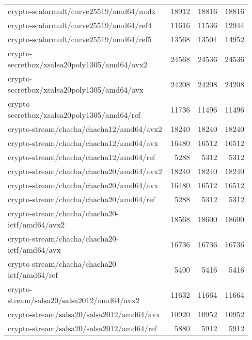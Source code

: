 \begin{table}
\begin{tabular}{lrrr}
crypto-scalarmult/curve25519/amd64/mulx &
18912 &
18816 &
18816\\ 


crypto-scalarmult/curve25519/amd64/ref4 &
11616 &
11536 &
12944\\ 


crypto-scalarmult/curve25519/amd64/ref5 &
13568 &
13504 &
14952\\ 


crypto-secretbox/xsalsa20poly1305/amd64/avx2 &
24568 &
24536 &
24536\\ 


crypto-secretbox/xsalsa20poly1305/amd64/avx &
24208 &
24208 &
24208\\ 


crypto-secretbox/xsalsa20poly1305/amd64/ref &
11736 &
11496 &
11496\\ 


crypto-stream/chacha/chacha12/amd64/avx2 &
18240 &
18240 &
18240\\ 


crypto-stream/chacha/chacha12/amd64/avx &
16480 &
16512 &
16512\\ 


crypto-stream/chacha/chacha12/amd64/ref &
5288 &
5312 &
5312\\ 


crypto-stream/chacha/chacha20/amd64/avx2 &
18240 &
18240 &
18240\\ 


crypto-stream/chacha/chacha20/amd64/avx &
16480 &
16512 &
16512\\ 


crypto-stream/chacha/chacha20/amd64/ref &
5288 &
5312 &
5312\\ 


crypto-stream/chacha/chacha20-ietf/amd64/avx2 &
18568 &
18600 &
18600\\ 


crypto-stream/chacha/chacha20-ietf/amd64/avx &
16736 &
16736 &
16736\\ 


crypto-stream/chacha/chacha20-ietf/amd64/ref &
5400 &
5416 &
5416\\ 


crypto-stream/salsa20/salsa2012/amd64/avx2 &
11632 &
11664 &
11664\\ 


crypto-stream/salsa20/salsa2012/amd64/avx &
10920 &
10952 &
10952\\ 


crypto-stream/salsa20/salsa2012/amd64/ref &
5880 &
5912 &
5912\\ 



\end{tabular}
\end{table}
